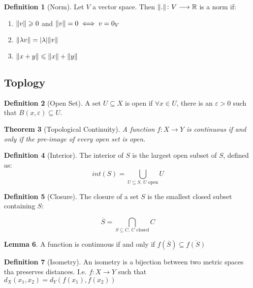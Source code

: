 \documentclass[11pt,a4paper, titlepage]{article}
\newtheorem{theorem}{Theorem}[section]
\DeclarePairedDelimiter\abs{\lvert}{\rvert}
\DeclarePairedDelimiter\norm{\lVert}{\rVert}
\theoremstyle{definition}
\newtheorem{definition}[theorem]{Definition}
\newtheorem{lemma}[theorem]{Lemma}
\begin{document}
\begin{definition}[Norm]
Let $V$ a vector space. Then $\norm{.} \colon V \longrightarrow \mathbb{R}$ is a norm if:
\begin{enumerate}
	\item $\norm{v} \geqslant 0$ and $\norm{v} = 0 \iff v = 0_V $
	\item $\norm{ \lambda v } = \abs{\lambda} \norm{v}$
	\item $\norm{x + y} \leqslant \norm{x} + \norm{y}$
\end{enumerate}
\end{definition}

\subsection{Toplogy}

\begin{definition}[Open Set]
A set $U \subseteq X$ is open if $\forall x \in U$, there is an $\varepsilon > 0$ such that $B(x, \varepsilon) \subseteq U$. 
\end{definition}

\begin{theorem}[Topological Continuity]
A function $f \colon X \longrightarrow Y$ is continuous if and only if the pre-image of every open set is open.
\end{theorem}

\begin{definition}[Interior]
The interior of $S$ is the largest open subset of $S$, defined as:
\[
	int(S) = \bigcup_{ U \subseteq S \textrm{,  } U \textrm{ open}} U
\]
\end{definition}

\begin{definition}[Closure]
The closure of a set $S$ is the smallest closed subset containing $S$:

\[
	\overline{S} = \bigcap_{S \subseteq C, \,  C\textrm{ closed}} C
\]
\end{definition}

\begin{lemma}
A function is continuous if and only if $f(\overline{S}) \subseteq \overline{f(S)}$
\end{lemma}

\begin{definition}[Isometry]
An isometry is a bijection between two metric spaces tha preserves distances. I.e. $f \colon X \longrightarrow Y$ such that $d_X(x_1,x_2) = d_Y(f(x_1), f(x_2))$
\end{definition}
\end{document}
